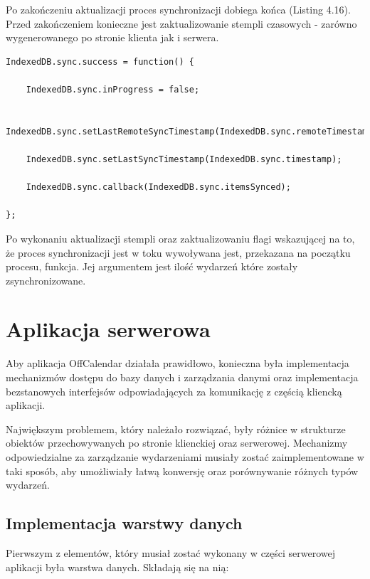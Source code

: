 Po zakończeniu aktualizacji proces synchronizacji dobiega końca (Listing 4.16). Przed zakończeniem konieczne jest zaktualizowanie stempli czasowych - zarówno wygenerowanego po stronie klienta jak i serwera.

\begin{lstlisting}[style=js, caption=Kod finalizujący proces synchronizacji., label=amb, captionpos=b]
IndexedDB.sync.success = function() {

	IndexedDB.sync.inProgress = false;

	IndexedDB.sync.setLastRemoteSyncTimestamp(IndexedDB.sync.remoteTimestamp);
    
	IndexedDB.sync.setLastSyncTimestamp(IndexedDB.sync.timestamp);

	IndexedDB.sync.callback(IndexedDB.sync.itemsSynced);

};
\end{lstlisting}

Po wykonaniu aktualizacji stempli oraz zaktualizowaniu flagi wskazującej na to, że proces synchronizacji jest w toku wywoływana jest, przekazana na początku procesu, funkcja. Jej argumentem jest ilość wydarzeń które zostały zsynchronizowane.

\section{Aplikacja serwerowa}
\label{sec:apSerw}

Aby aplikacja OffCalendar działała prawidłowo, konieczna była implementacja mechanizmów dostępu do bazy danych i zarządzania danymi oraz implementacja bezstanowych interfejsów odpowiadających za komunikację z częścią kliencką aplikacji.

Największym problemem, który należało rozwiązać, były różnice w strukturze obiektów przechowywanych po stronie klienckiej oraz serwerowej. Mechanizmy odpowiedzialne za zarządzanie wydarzeniami musiały zostać zaimplementowane w taki sposób, aby umożliwiały łatwą konwersję oraz porównywanie różnych typów wydarzeń.

\subsection{Implementacja warstwy danych}
\label{komBazaDanych}

Pierwszym z elementów, który musiał zostać wykonany w części serwerowej aplikacji była warstwa danych. Składają się na nią: 

